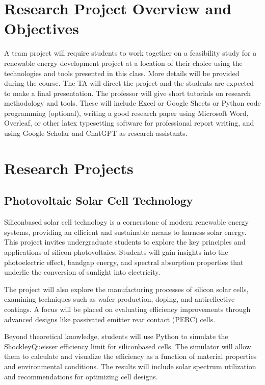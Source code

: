\documentclass[letterpaper,10pt,english]{jupyterBook}
\begin{document}
\section{Research Project Overview and Objectives}
\label{\detokenize{ProjectSyllabus:research-project-overview-and-objectives}}
\sphinxAtStartPar
A team project will require students to work
together on a feasibility study for a renewable energy development
project at a location of their choice using the technologies and tools
presented in this class. More details will be provided during the
course. The TA will direct the project and the students are expected to
make a final presentation. The professor will give short tutorials on
research methodology and tools. These will include Excel or Google
Sheets or Python code programming (optional), writing a good research
paper using Microsoft Word, Overleaf, or other latex typesetting
software for professional report writing, and using Google Scholar and
ChatGPT as research assistants.


\section{Research Projects}
\label{\detokenize{ProjectSyllabus:research-projects}}

\subsection{Photovoltaic Solar Cell Technology}
\label{\detokenize{ProjectSyllabus:photovoltaic-solar-cell-technology}}
\sphinxAtStartPar
Silicon\sphinxhyphen{}based solar cell technology is a cornerstone of modern renewable
energy systems, providing an efficient and sustainable means to harness
solar energy. This project invites undergraduate students to explore the
key principles and applications of silicon photovoltaics. Students will
gain insights into the photoelectric effect, bandgap energy, and
spectral absorption properties that underlie the conversion of sunlight
into electricity.

\sphinxAtStartPar
The project will also explore the manufacturing processes of silicon
solar cells, examining techniques such as wafer production, doping, and
anti\sphinxhyphen{}reflective coatings. A focus will be placed on evaluating
efficiency improvements through advanced designs like passivated emitter
rear contact (PERC) cells.

\sphinxAtStartPar
Beyond theoretical knowledge, students will use Python to simulate the
Shockley\sphinxhyphen{}Queisser efficiency limit for silicon\sphinxhyphen{}based cells. The
simulator will allow them to calculate and visualize the efficiency as a
function of material properties and environmental conditions. The
results will include solar spectrum utilization and recommendations for
optimizing cell designs.
\end{document}
